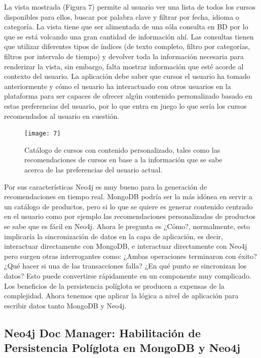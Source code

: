\documentclass[conference]{IEEEtran}
\begin{document}
La vista mostrada (Figura 7) permite al usuario ver una lista de todos los cursos disponibles para ellos, buscar por palabra clave y filtrar por fecha, idioma o categor\'ia. La vista tiene que ser alimentada de una s\'ola consulta en BD por lo que se est\'a volcando una gran cantidad de informaci\'on ah\'i. Las consultas tienen que utilizar diferentes tipos de \'indices (de texto completo, filtro por categor\'ias, filtros por intervalo de tiempo) y devolver toda la informaci\'on necesaria para renderizar la vista, sin embargo, falta mostrar informaci\'on que est\'e acorde al contexto del usuario. La aplicaci\'on debe saber que cursos el usuario ha tomado anteriormente y c\'omo el usuario ha interactuado con otros usuarios en la plataforma para ser capaces de ofrecer alg\'un contenido personalizado basado en estas preferencias del usuario, por lo que entra en juego lo que ser\'ia los cursos recomendados al usuario en cuesti\'on.

\begin{figure}[!h]
\centering
\texttt{[image: 7]}
\caption{Cat\'alogo de cursos con contenido personalizado, tales como las recomendaciones de cursos en base a la informaci\'on que se sabe acerca de las preferencias del usuario actual.}
\label{fig7}
\end{figure}

Por sus caracter\'isticas Neo4j es muy bueno para la generaci\'on de recomendaciones en tiempo real. MongoDB podr\'ia ser la m\'as id\'onea en servir a un cat\'alogo de productos, pero si lo que se quiere es generar contenido centrado en el usuario como por ejemplo las recomendaciones personalizadas de productos se sabe que es f\'acil en Neo4j. Ahora le pregunta es ¿C\'omo?, normalmente, esto implicar\'ia la sincronizaci\'on de datos en la capa de aplicaci\'on, es decir, interactuar directamente con  MongoDB, e interactuar directamente con Neo4j pero surgen otras interrogantes como: ¿Ambas operaciones terminaron con \'exito? ¿Qu\'e hacer si una de las transacciones falla? ¿En qu\'e punto se sincronizan los datos? Esto puede convertirse r\'apidamente en un componente muy complicado. Los beneficios de la persistencia pol\'iglota se producen a expensas de la complejidad. Ahora tenemos que aplicar la l\'ogica a nivel de aplicaci\'on para escribir datos tanto MongoDB y Neo4j.

\subsection*{Neo4j Doc Manager: Habilitaci\'on de Persistencia Pol\'iglota en MongoDB y Neo4j}
\end{document}

